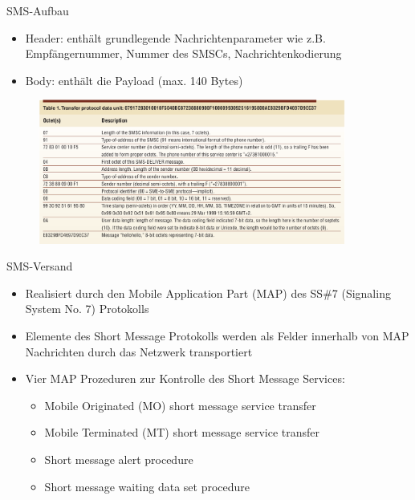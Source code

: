 \documentclass{beamer}
\begin{document}
\begin{frame}{SMS-Aufbau}
	\begin{itemize}
		\item Header: enthält grundlegende Nachrichtenparameter wie z.B. 
			Empfängernummer, Nummer des SMSCs, Nachrichtenkodierung
		\item Body: enthält die Payload (max. 140 Bytes)
	\end{itemize}
	\begin{figure}[htm]
		\includegraphics[width=0.9\textwidth]{img/tpdu-example.png}
		\label{tpdu-example}
	\end{figure}
\end{frame}

\begin{frame}{SMS-Versand}
	\begin{itemize}
		\item Realisiert durch den Mobile Application Part (MAP) des SS\#7 
			(Signaling System No. 7) Protokolls 
		\item Elemente des Short Message Protokolls werden als Felder innerhalb 
			von MAP Nachrichten durch das Netzwerk transportiert
		\item Vier MAP Prozeduren zur Kontrolle des Short Message Services:
			\begin{itemize}
				\item Mobile Originated (MO) short message service transfer
				\item Mobile Terminated (MT) short message service transfer
				\item Short message alert procedure
				\item Short message waiting data set procedure
			\end{itemize}
	\end{itemize}
\end{frame}
\end{document}
